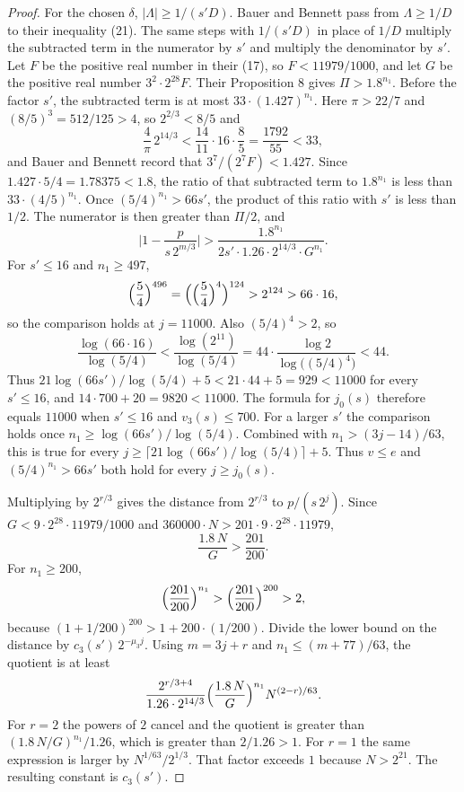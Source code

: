 \documentclass[11pt]{article}
\begin{document}
\begin{proof}
For the chosen $\delta$, $\lvert \Lambda \rvert \ge 1/(s' D)$.
Bauer and Bennett pass from $\Lambda \ge 1/D$ to their inequality (21).
The same steps with $1/(s' D)$ in place of $1/D$ multiply the subtracted term in the numerator by $s'$ and multiply the denominator by $s'$.
Let $F$ be the positive real number in their (17), so $F < 11979/1000$, and let $G$ be the positive real number $3^2 \cdot 2^{28} F$.
Their Proposition 8 gives $\Pi > 1.8^{n_1}$.
Before the factor $s'$, the subtracted term is at most $33 \cdot (1.427)^{n_1}$.
Here $\pi > 22/7$ and $(8/5)^3 = 512/125 > 4$, so $2^{2/3} < 8/5$ and
\[
\frac{4}{\pi}\, 2^{14/3} < \frac{14}{11} \cdot 16 \cdot \frac{8}{5} = \frac{1792}{55} < 33,
\]
and Bauer and Bennett record that $3^7/(2^7 F) < 1.427$.
Since $1.427 \cdot 5/4 = 1.78375 < 1.8$, the ratio of that subtracted term to $1.8^{n_1}$ is less than $33 \cdot (4/5)^{n_1}$.
Once $(5/4)^{n_1} > 66 s'$, the product of this ratio with $s'$ is less than $1/2$.
The numerator is then greater than $\Pi/2$, and
\[
\Biggl\lvert 1 - \frac{p}{s\, 2^{m/3}} \Biggr\rvert
> \frac{1.8^{n_1}}{2 s' \cdot 1.26 \cdot 2^{14/3} \cdot G^{n_1}}.
\]
For $s' \le 16$ and $n_1 \ge 497$,
\[
\Bigl(\frac54\Bigr)^{496} = \Bigl(\Bigl(\frac54\Bigr)^4\Bigr)^{124} > 2^{124} > 66 \cdot 16,
\]
so the comparison holds at $j = 11000$.
Also $(5/4)^4 > 2$, so
\[
\frac{\log(66 \cdot 16)}{\log(5/4)} < \frac{\log(2^{11})}{\log(5/4)} = 44 \cdot \frac{\log 2}{\log\bigl((5/4)^4\bigr)} < 44.
\]
Thus $21\log(66 s')/\log(5/4) + 5 < 21 \cdot 44 + 5 = 929 < 11000$ for every $s' \le 16$, and $14 \cdot 700 + 20 = 9820 < 11000$.
The formula for $j_0(s)$ therefore equals $11000$ when $s' \le 16$ and $v_3(s) \le 700$.
For a larger $s'$ the comparison holds once $n_1 \ge \log(66 s')/\log(5/4)$.
Combined with $n_1 > (3j - 14)/63$, this is true for every $j \ge \lceil 21\log(66 s')/\log(5/4)\rceil + 5$.
Thus $v \le e$ and $(5/4)^{n_1} > 66 s'$ both hold for every $j \ge j_0(s)$.

Multiplying by $2^{r/3}$ gives the distance from $2^{r/3}$ to $p/(s\, 2^j)$.
Since $G < 9 \cdot 2^{28} \cdot 11979/1000$ and $360000 \cdot N > 201 \cdot 9 \cdot 2^{28} \cdot 11979$,
\[
\frac{1.8\, N}{G} > \frac{201}{200}.
\]
For $n_1 \ge 200$,
\[
\Bigl(\frac{201}{200}\Bigr)^{n_1} > \Bigl(\frac{201}{200}\Bigr)^{200} > 2,
\]
because $(1 + 1/200)^{200} > 1 + 200 \cdot (1/200)$.
Divide the lower bound on the distance by $c_3(s')\, 2^{-\mu_3 j}$.
Using $m = 3j + r$ and $n_1 \le (m + 77)/63$, the quotient is at least
\[
\frac{2^{r/3 + 4}}{1.26 \cdot 2^{14/3}} \Bigl(\frac{1.8\, N}{G}\Bigr)^{n_1} N^{(2 - r)/63}.
\]
For $r = 2$ the powers of $2$ cancel and the quotient is greater than $(1.8\, N/G)^{n_1}/1.26$, which is greater than $2/1.26 > 1$.
For $r = 1$ the same expression is larger by $N^{1/63}/2^{1/3}$.
That factor exceeds $1$ because $N > 2^{21}$.
The resulting constant is $c_3(s')$.
\end{proof}
\end{document}
